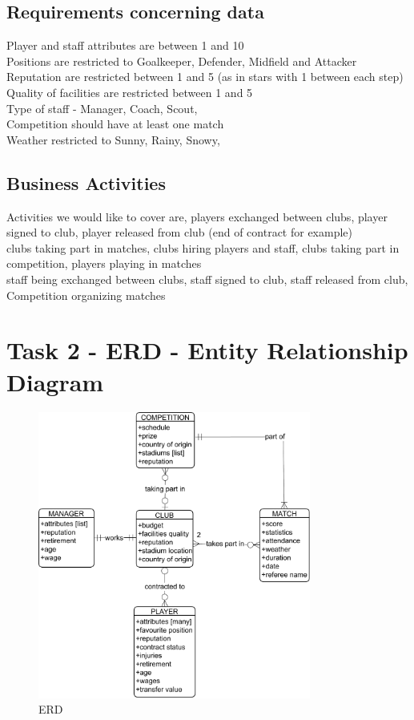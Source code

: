 \documentclass{report}
\begin{document}
\section{Requirements concerning data}
Player and staff attributes are between 1 and 10 \\ 
Positions are restricted to Goalkeeper, Defender, Midfield and Attacker \\ 
Reputation are restricted between 1 and 5 (as in stars with 1 between each step) \\
Quality of facilities are restricted between 1 and 5 \\ 
Type of staff - Manager, Coach, Scout, \\ 
Competition should have at least one match \\ 
Weather restricted to Sunny, Rainy, Snowy, \\ 

\section{Business Activities}
Activities we would like to cover are, players exchanged between clubs, player signed to club, player released from club (end of contract for example)
\\
clubs taking part in matches, clubs hiring players and staff, clubs taking part in competition, 
players playing in matches \\
staff being exchanged between clubs, staff signed to club, staff released from club, \\ 
Competition organizing matches

\chapter{Task 2 - ERD - Entity Relationship Diagram}
\begin{figure}[htpb]
    \centering
    \includegraphics[width=0.8\textwidth]{erd.pdf}
    \caption{ERD}
    \label{fig:tikzpgf}
\end{figure}
\end{document}

